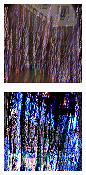 \begin{figure}[]
\begin{subfigure}{\textwidth}
\begin{subfigure}{0.19\textwidth}
            \caption*{}
        \end{subfigure}
        \hfill
        \begin{subfigure}{0.19\textwidth}
            \centering
            \includegraphics[width=\textwidth]{images/04-experiment03/staircase_illum/wood/stats_proj.jpg}
            \caption*{}
        \end{subfigure}
        \hfill
        \begin{subfigure}{0.19\textwidth}
            \centering
            \includegraphics[width=\textwidth]{images/04-experiment03/staircase_illum/wood/pixel_im.jpg}

\end{subfigure}
\end{subfigure}
\end{figure}
